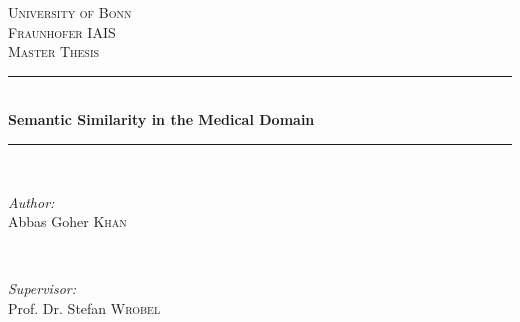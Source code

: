 \begin{titlepage}

\newcommand{\HRule}{\rule{\linewidth}{0.5mm}} %

\center %
 

\textsc{\LARGE University of Bonn}\\[1cm] %
\textsc{\LARGE Fraunhofer IAIS}\\[1cm] 
\textsc{\Large Master Thesis}\\[0.5cm] %


\HRule 
\\[0.4cm]
\huge \bfseries Semantic Similarity in the Medical Domain
\\[0.1cm] %
\HRule 
\\[1.5cm]
 

\begin{minipage}{0.4\textwidth}
\begin{flushleft} \large
\emph{Author:}\\
Abbas Goher \textsc{Khan} %
\end{flushleft}
\end{minipage}
~
\begin{minipage}{0.5\textwidth}
\begin{flushright} \large
\emph{Supervisor:} \\
Prof. Dr. Stefan \textsc{Wrobel} %
\end{flushright}
\end{minipage}\\[0.5cm]


\end{titlepage}
